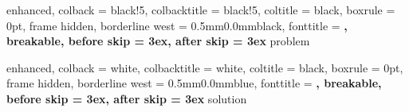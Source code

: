 \usepackage{titlesec}
\usepackage[many]{tcolorbox}

\titlespacing*{\chapter}{0cm}{-2.0cm}{0.50cm}
\titlespacing*{\section}{0cm}{0.50cm}{0.25cm}

\setlength{\parindent}{0pt}
\setlength{\parskip}{1ex}


%
    {enhanced,
    colback = black!5, %
    colbacktitle = black!5,
    coltitle = black,
    boxrule = 0pt,
    frame hidden,
    borderline west = {0.5mm}{0.0mm}{black},
    fonttitle = \bfseries,
    breakable,
    before skip = 3ex,
    after skip = 3ex
}{problem}

%
    {enhanced,
    colback = white,
    colbacktitle = white,
    coltitle = black,
    boxrule = 0pt,
    frame hidden,
    borderline west = {0.5mm}{0.0mm}{blue},
    fonttitle = \bfseries,
    breakable,
    before skip = 3ex,
    after skip = 3ex
}{solution}



